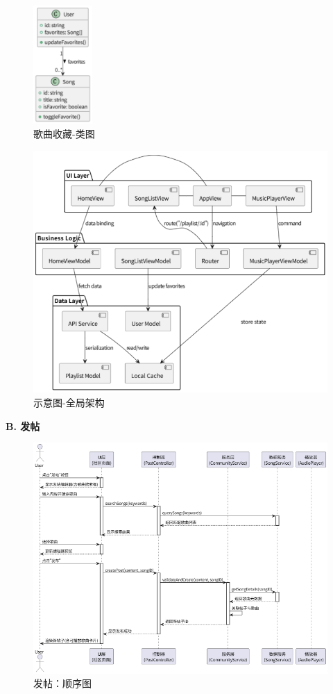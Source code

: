\documentclass{base}
\numberwithin{figure}{section} %
\begin{document}
\begin{figure}[H]
    \centering
    \includegraphics[width=0.2\textwidth]{images/5-6.png}
    \caption{歌曲收藏-类图}
\end{figure}
\begin{figure}[H]
    \centering
    \includegraphics[width=\textwidth]{images/5-7.png}
    \caption{示意图-全局架构}
\end{figure}

\textbf{B. 发帖}

\begin{figure}[H]
    \centering
    \includegraphics[width=\textwidth]{images/post-1.png}
    \caption{发帖：顺序图}
\end{figure}
\end{document}
